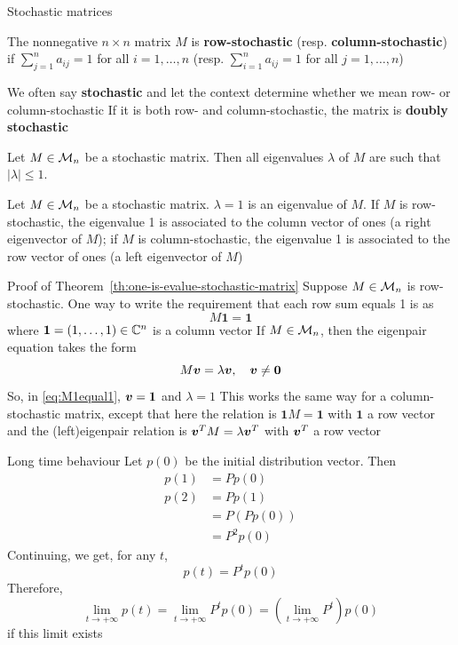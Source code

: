 \documentclass[aspectratio=169]{beamer}\usepackage[]{graphicx}\usepackage[]{xcolor}
\begin{document}
\begin{frame}{Stochastic matrices}
\begin{definition}
The nonnegative $n\times n$ matrix $M$ is \textbf{row-stochastic} (resp. \textbf{column-stochastic}) if $\sum_{j=1}^na_{ij}=1$ for all $i=1,\dots,n$ (resp. $\sum_{i=1}^na_{ij}=1$ for all $j=1,\dots,n$)
\end{definition}
\vfill
We often say \textbf{stochastic} and let the context determine whether we mean row- or column-stochastic
\vfill
If it is both row- and column-stochastic, the matrix is \textbf{doubly stochastic}
\vfill
\begin{theorem}\label{th:spectrum_stochastic_matrix}
Let $M\in\mathcal{M}_n$ be a stochastic matrix. Then all eigenvalues $\lambda$ of $M$ are such that $|\lambda|\leq 1$.
\end{theorem}
\end{frame}

\begin{frame}
\begin{importanttheorem}
\label{th:one-is-evalue-stochastic-matrix}
Let $M\in\mathcal{M}_n$ be a stochastic matrix. $\lambda =1$ is an eigenvalue of $M$. 
If $M$ is row-stochastic, the eigenvalue 1 is associated to the column vector of ones (a right eigenvector of $M$); if $M$ is column-stochastic, the eigenvalue 1 is associated to the row vector of ones (a left eigenvector of $M$)
\end{importanttheorem}
\end{frame}

\begin{frame}[red]{Proof of Theorem~\ref{th:one-is-evalue-stochastic-matrix}}
Suppose $M\in\mathcal{M}_n$ is row-stochastic. One way to write the requirement that each row sum equals 1 is as 
\begin{equation}\label{eq:M1equal1}
M\mathbf{1}=\mathbf{1}
\end{equation}
where $\mathbf{1}=(1,\ldots,1)\in\mathbb{C}^n$ is a column vector
\vfill
If $M\in\mathcal{M}_n$, then the eigenpair equation takes the form
\[
M\bv=\lambda\bv,\quad \bv\neq\b0
\]
So, in \eqref{eq:M1equal1}, $\bm{v}=\mathbf{1}$ and $\lambda=1$
\vfill
This works the same way for a column-stochastic matrix, except that here the relation is $\mathbf{1}M=\mathbf{1}$ with $\mathbf{1}$ a row vector and the (left)eigenpair relation is $\bm{v}^TM=\lambda\bm{v}^T$ with $\bm{v}^T$ a row vector
\end{frame}

\begin{frame}{Long time behaviour}
Let $p(0)$ be the initial distribution vector. Then
\begin{align*}
p(1) &= Pp(0) \\
p(2) &= Pp(1) \\
&= P\left(Pp(0)\right) \\
&= P^2p(0)
\end{align*}
\vfill
Continuing, we get, for any $t$,
\[
p(t)=P^tp(0)
\]
\vfill
Therefore, 
\[
\lim_{t\rightarrow +\infty}p(t) =
\lim_{t\rightarrow +\infty}P^tp(0) =
\left(\lim_{t\rightarrow +\infty}P^t\right)
p(0)
\]
if this limit exists
\end{frame}
\end{document}
